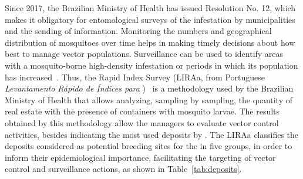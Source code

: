 Since 2017, the Brazilian Ministry of Health has issued Resolution No. 12, which makes it obligatory for entomological surveys of the \Aedes infestation by municipalities and the sending of information. Monitoring the numbers and geographical distribution of mosquitoes over time helps in making timely decisions about how best to manage vector populations.
Surveillance can be used to identify areas with a mosquito-borne high-density infestation or periods in which its population has increased~\cite{brasil2017msresolution}.
Thus, the \Aedes Rapid Index Survey (LIRAa, from Portuguese \textit{Levantamento Rápido de Índices para \Aedes})~\cite{brasil2013LIRAa} is a methodology used by the Brazilian Ministry of Health that allows analyzing, sampling by sampling, the quantity of real estate with the presence of containers with mosquito larvae. The results obtained by this methodology allow the managers to evaluate vector control activities, besides indicating the most used deposits by \Aedes.
The LIRAa classifies the deposits considered as potential breeding sites for the \Aedes in five groups, in order to inform their epidemiological importance, facilitating the targeting of vector control and surveillance actions, as shown in Table~\ref{tab:deposits}.
%
%
